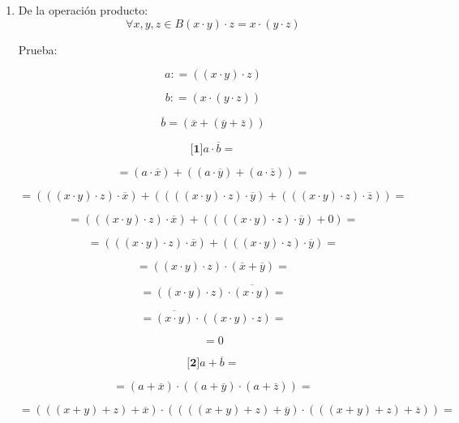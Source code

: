 \begin{enumerate}
\begin{enumerate}
\begin{enumerate}
\begin{enumerate}
        \[{= {\overline{({x\cdot y})} \cdot {({{({x \cdot y})} \cdot z})}}} =\]

        \[= 0\]

        \[\mathit{De}{\lbrack\mathbf{1}\rbrack}y\mathit{de}{\lbrack\mathbf{2}\rbrack}\mathit{obtenemos}\mathit{que}{\overline{a} = \overline{b}}\Rightarrow{a = b}\]
      \item
        De la operación producto:
        \[\forall x,y,{z \in B}{{{({x \cdot y})} \cdot z} = {x \cdot {({y \cdot z})}}}\]

        Prueba:

        \[a{: = {({{({x \cdot y})} \cdot z})}}\]

        \[b{: = {({x \cdot {({y \cdot z})}})}}\]

        \[\overline{b}{= {({\overline{x} + {({\overline{y} + \overline{z}})}})}}\]

        \[{\lbrack\mathbf{1}\rbrack}{{a \cdot \overline{b}} =}\]

        \[{= {{({a \cdot \overline{x}})} + {({{({a \cdot \overline{y}})} + {({a \cdot \overline{z}})}})}}} =\]

        \[{= {{({{({{({x \cdot y})} \cdot z})} \cdot \overline{x}})} + {({{({{({{({x \cdot y})} \cdot z})} \cdot \overline{y}})} + {({{({{({x \cdot y})} \cdot z})} \cdot \overline{z}})}})}}} =\]

        \[{= {{({{({{({x \cdot y})} \cdot z})} \cdot \overline{x}})} + {({{({{({{({x \cdot y})} \cdot z})} \cdot \overline{y}})} + 0})}}} =\]

        \[{= {{({{({{({x \cdot y})} \cdot z})} \cdot \overline{x}})} + {({{({{({x \cdot y})} \cdot z})} \cdot \overline{y}})}}} =\]

        \[{= {{({{({x \cdot y})} \cdot z})} \cdot {({\overline{x} + \overline{y}})}}} =\]

        \[{= {{({{({x \cdot y})} \cdot z})} \cdot \overline{({x\cdot y})}}} =\]

        \[{= {\overline{({x\cdot y})} \cdot {({{({x \cdot y})} \cdot z})}}} =\]

        \[= 0\]

        \[{\lbrack\mathbf{2}\rbrack}{{a + \overline{b}} =}\]

        \[{= {{({a + \overline{x}})} \cdot {({{({a + \overline{y}})} \cdot {({a + \overline{z}})}})}}} =\]

        \[{= {{({{({{({x + y})} + z})} + \overline{x}})} \cdot {({{({{({{({x + y})} + z})} + \overline{y}})} \cdot {({{({{({x + y})} + z})} + \overline{z}})}})}}} =\]


\end{enumerate}
\end{enumerate}
\end{enumerate}
\end{enumerate}
